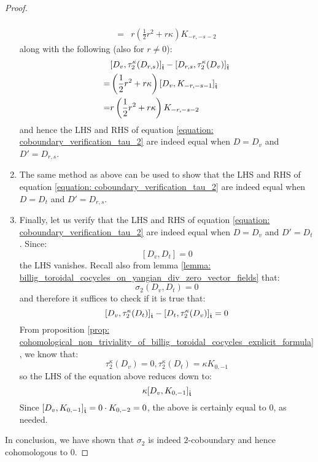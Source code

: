 \begin{proof}
\begin{enumerate}
$$\begin{aligned}
                                \\
                                = & r \left(\frac12 r^2 + r \kappa \right) K_{-r, -s - 2}
                            \end{aligned}
                        $$
                    along with the following (also for $r \not = 0$):
                        $$
                            \begin{aligned}
                                & [D_v, \tau_2^{\kappa}(D_{r, s})]_{\hat{\mathfrak{t}}} - [D_{r, s}, \tau_2^{\kappa}(D_v)]_{\hat{\mathfrak{t}}}
                                \\
                                = & \left(\frac12 r^2 + r \kappa \right)[D_v, K_{-r, -s - 1}]_{\hat{\mathfrak{t}}}
                                \\
                                = & r \left(\frac12 r^2 + r \kappa \right) K_{-r, -s - 2}
                            \end{aligned}
                        $$
                    and hence the LHS and RHS of equation \eqref{equation: coboundary_verification_tau_2} are indeed equal when $D = D_v$ and $D' = D_{r, s}$.
                    \item The same method as above can be used to show that the LHS and RHS of equation \eqref{equation: coboundary_verification_tau_2} are indeed equal when $D = D_t$ and $D' = D_{r, s}$.
                    \item Finally, let us verify that the LHS and RHS of equation \eqref{equation: coboundary_verification_tau_2} are indeed equal when $D = D_v$ and $D' = D_t$. Since:
                        $$[D_v, D_t] = 0$$
                    the LHS vanishes. Recall also from lemma \ref{lemma: billig_toroidal_cocycles_on_yangian_div_zero_vector_fields} that:
                        $$\sigma_2(D_v, D_t) = 0$$
                    and therefore it suffices to check if it is true that:
                        $$[D_v, \tau_2^{\kappa}(D_t)]_{\hat{\mathfrak{t}}} - [D_t, \tau_2^{\kappa}(D_v)]_{\hat{\mathfrak{t}}} = 0$$
                    From proposition \ref{prop: cohomological_non_triviality_of_billig_toroidal_cocycles_explicit_formula}, we know that:
                        $$\tau_2^{\kappa}(D_v) = 0, \tau_2^{\kappa}(D_t) = \kappa K_{0, -1}$$
                    so the LHS of the equation above reduces down to:
                        $$\kappa [D_v, K_{0, -1}]_{\hat{\mathfrak{t}}}$$
                    Since $[D_v, K_{0, -1}]_{\hat{\mathfrak{t}}} = 0 \cdot K_{0, -2} = 0$, the above is certainly equal to $0$, as needed.
                \end{enumerate}
                In conclusion, we have shown that $\sigma_2$ is indeed $2$-coboundary and hence cohomologous to $0$.
            \end{proof}

